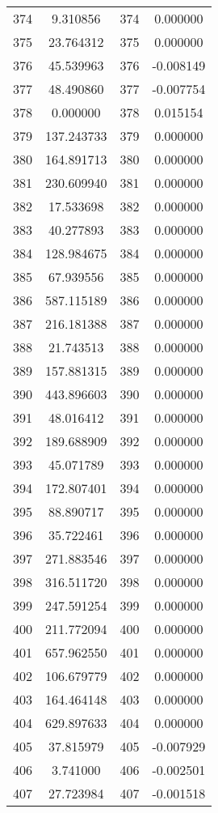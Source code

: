 \documentclass[12pt]{article}
\begin{document}
\begin{longtable}{@{}cccc@{}}
374 & 9.310856 & 374 & 0.000000 \\
375 & 23.764312 & 375 & 0.000000 \\
376 & 45.539963 & 376 & -0.008149 \\
377 & 48.490860 & 377 & -0.007754 \\
378 & 0.000000 & 378 & 0.015154 \\
379 & 137.243733 & 379 & 0.000000 \\
380 & 164.891713 & 380 & 0.000000 \\
381 & 230.609940 & 381 & 0.000000 \\
382 & 17.533698 & 382 & 0.000000 \\
383 & 40.277893 & 383 & 0.000000 \\
384 & 128.984675 & 384 & 0.000000 \\
385 & 67.939556 & 385 & 0.000000 \\
386 & 587.115189 & 386 & 0.000000 \\
387 & 216.181388 & 387 & 0.000000 \\
388 & 21.743513 & 388 & 0.000000 \\
389 & 157.881315 & 389 & 0.000000 \\
390 & 443.896603 & 390 & 0.000000 \\
391 & 48.016412 & 391 & 0.000000 \\
392 & 189.688909 & 392 & 0.000000 \\
393 & 45.071789 & 393 & 0.000000 \\
394 & 172.807401 & 394 & 0.000000 \\
395 & 88.890717 & 395 & 0.000000 \\
396 & 35.722461 & 396 & 0.000000 \\
397 & 271.883546 & 397 & 0.000000 \\
398 & 316.511720 & 398 & 0.000000 \\
399 & 247.591254 & 399 & 0.000000 \\
400 & 211.772094 & 400 & 0.000000 \\
401 & 657.962550 & 401 & 0.000000 \\
402 & 106.679779 & 402 & 0.000000 \\
403 & 164.464148 & 403 & 0.000000 \\
404 & 629.897633 & 404 & 0.000000 \\
405 & 37.815979 & 405 & -0.007929 \\
406 & 3.741000 & 406 & -0.002501 \\
407 & 27.723984 & 407 & -0.001518 \\

\end{longtable}
\end{document}
